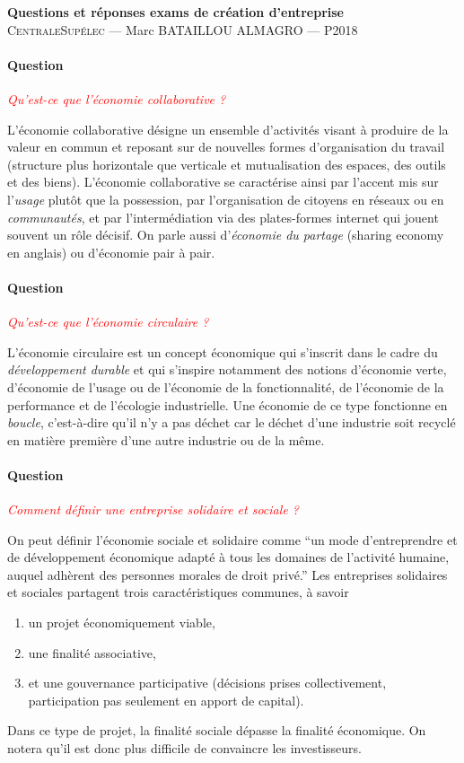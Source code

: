 \documentclass[12pt,oneside,a4paper]{article}
\newcommand{\question}[1]
{
\addtocounter{section}{1}
\paragraph*{Question \thesection}
\emph{\textcolor{red}{#1}}
}
\begin{document}
\begin{center}
{\LARGE \bfseries 
 Questions et réponses exams de création d'entreprise \\[0.3cm] 
}
{\large
  \textsc{CentraleSupélec} --- Marc BATAILLOU ALMAGRO --- P2018\\[0.7cm]
}
\end{center}

\question{Qu'est-ce que l'économie collaborative ?}
L'économie collaborative désigne un ensemble d'activités visant à produire de la valeur en commun 
et reposant sur de nouvelles formes d'organisation du travail 
(structure plus horizontale que verticale et mutualisation des espaces, des outils et des biens).
L'économie collaborative se caractérise ainsi par l'accent mis sur l'\emph{usage} plutôt que la possession,
par l'organisation de citoyens en réseaux ou en \emph{communautés}, 
et par l'intermédiation via des plates-formes internet qui jouent souvent un rôle décisif. 
On parle aussi d'\emph{économie du partage} (sharing economy en anglais) ou d'économie pair à pair. 

\question{Qu'est-ce que l'économie circulaire ?}
L'économie circulaire est un concept économique qui s'inscrit dans le cadre du \emph{développement 
durable} et qui s'inspire notamment des notions d'économie verte, d’économie de l'usage 
ou de l'économie de la fonctionnalité, de l'économie de la performance et de l'écologie industrielle.
Une économie de ce type fonctionne en \emph{boucle}, c'est-à-dire qu'il n'y a pas déchet car
le déchet d'une industrie soit recyclé en matière première d'une autre industrie ou de la même.

\question{Comment définir une entreprise solidaire et sociale ?}
On peut définir l'économie sociale et solidaire comme ``un mode d'entreprendre et de développement
économique adapté à tous les domaines de l'activité humaine, 
auquel adhèrent des personnes morales de droit privé.''
Les entreprises solidaires et sociales partagent trois caractéristiques communes, à savoir
\begin{enumerate}
  \item un projet économiquement viable,
  \item une finalité associative,
  \item et une gouvernance participative (décisions prises collectivement, participation pas seulement en apport de capital).
\end{enumerate}
Dans ce type de projet, la finalité sociale dépasse la finalité économique.
On notera qu'il est donc plus difficile de convaincre les investisseurs.
\end{document}
